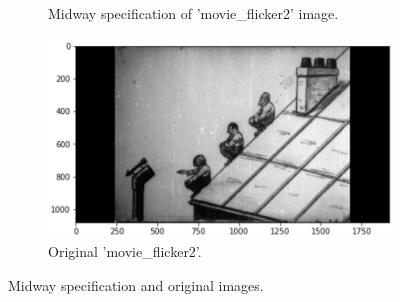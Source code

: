 \begin{figure}[H]
\begin{subfigure}[b]{0.45\textwidth}
		\caption{Midway specification of 'movie\_flicker2' image.}
	\end{subfigure}
	\hfill
	\begin{subfigure}[b]{0.45\textwidth}
		\centering
		\includegraphics[width=\textwidth]{Materials/Flicker2}
		\caption{Original 'movie\_flicker2'.}
	\end{subfigure}
	\caption{Midway specification and original images.}
	\label{midway}
\end{figure}

